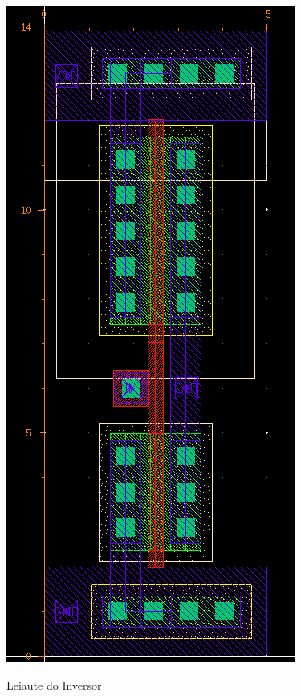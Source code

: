 \documentclass{iiufrgs}
\begin{document}
\begin{figure}[htbp]
    \centering
    \caption{Leiaute do Inversor}
    \includegraphics[scale=0.75]{images/layout_inv.png}
    \label{fig:inv_leiaute}
\end{figure}
\end{document}
